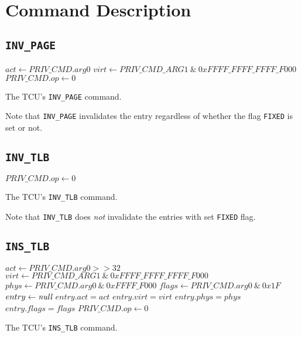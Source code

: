 \section{Command Description}

\subsection{\texttt{INV\_PAGE}}

\begin{algorithm}[H]
    \colorbox{tilemux}{$act \gets PRIV\_CMD.arg0$}\;
    $virt \gets PRIV\_CMD\_ARG1\ \&\ 0xFFFF\_FFFF\_FFFF\_F000$\;
    \BlankLine
    \BlankLine
    $PRIV\_CMD.op \gets 0$\;
    \caption{The TCU's \texttt{INV\_PAGE} command.}
\end{algorithm}

\noindent Note that \texttt{INV\_PAGE} invalidates the entry regardless of whether the flag
\texttt{FIXED} is set or not.

\subsection{\texttt{INV\_TLB}}

\begin{algorithm}[H]
    \BlankLine
    $PRIV\_CMD.op \gets 0$\;
    \caption{The TCU's \texttt{INV\_TLB} command.}
\end{algorithm}

\noindent Note that \texttt{INV\_TLB} does \emph{not} invalidate the entries with set \texttt{FIXED}
flag.

\subsection{\texttt{INS\_TLB}}

\begin{algorithm}[H]
    \colorbox{tilemux}{$act \gets PRIV\_CMD.arg0 >> 32$}\;
    $virt \gets PRIV\_CMD\_ARG1\ \&\ 0xFFFF\_FFFF\_FFFF\_F000$\;
    $phys \gets PRIV\_CMD.arg0\ \&\ 0xFFFF\_F000$\;
    $flags \gets PRIV\_CMD.arg0\ \&\ 0x1F$\;
    \BlankLine
    $entry \gets \emph{null}$\;
    \BlankLine
    \BlankLine
    \colorbox{tilemux}{$entry.act = act$}\;
    $entry.virt = virt$\;
    $entry.phys = phys$\;
    $entry.flags = flags$\;
    $PRIV\_CMD.op \gets 0$\;
    \caption{The TCU's \texttt{INS\_TLB} command.}
\end{algorithm}
\extend{}

